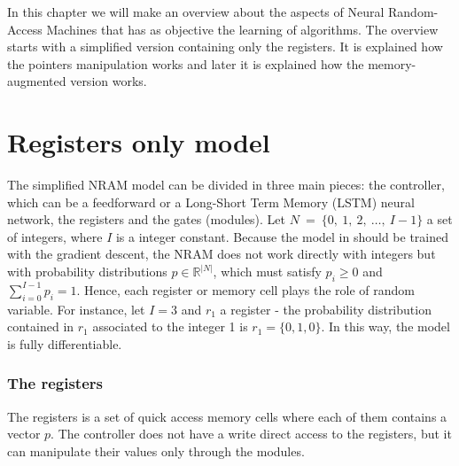 \label{chap:nram}
In this chapter we will make an overview about the aspects of Neural Random-Access Machines \cite{NRAM:2016} that has as objective the learning of algorithms. The overview starts with a simplified version containing only the registers. It is explained how the pointers manipulation works and later it is explained how the memory-augmented version works.

\section{Registers only model}
The simplified NRAM model can be divided in three main pieces: the controller, which can be a feedforward or a Long-Short Term Memory (LSTM) neural network, the registers and the gates (modules). \newline \newline 
Let $N\ =\ \{0,\ 1,\ 2,\ \dots,\ I - 1\}$ a set of integers, where $I$ is a integer constant. Because the model in \cite{NRAM:2016} should be trained with the gradient descent, the NRAM does not work directly with integers but with probability distributions $p \in \mathbb{R}^{|N|}$, which must satisfy $p_{i} \geq 0$ and $\sum\limits_{i = 0}^{I-1} p_{i} = 1$. Hence, each register or memory cell plays the role of random variable. For instance, let $I = 3$ and $r_1$ a register - the probability distribution contained in $r_1$ associated to the integer 1 is $r_1 = \{0, 1, 0\}$. In this way, the model is fully differentiable.

\subsubsection*{The registers}
The registers is a set of quick access memory cells where each of them contains a vector $p$. The controller does not have a write direct access to the registers, but it can manipulate their values only through the modules.

